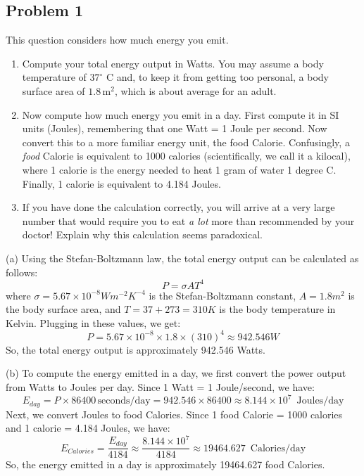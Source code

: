 \documentclass[letterpaper, 11pt]{article}
\newcommand{\1}{\mathds{1}}	%
\theoremstyle{definition}
\begin{document}
\subsection*{Problem 1}
This question considers how much energy you emit.

\begin{enumerate}
\item[(a)] Compute your total energy output in Watts. You may assume a body temperature of $37^\circ$ C and, to keep it from getting too personal, a body surface area of $1.8\,\text{m}^2$, which is about average for an adult.

\item[(b)] Now compute how much energy you emit in a day. First compute it in SI units (Joules), remembering that one Watt = 1 Joule per second. Now convert this to a more familiar energy unit, the food Calorie. Confusingly, a \textit{food} Calorie is equivalent to 1000 calories (scientifically, we call it a kilocal), where 1 calorie is the energy needed to heat 1 gram of water 1 degree C. Finally, 1 calorie is equivalent to 4.184 Joules.

\item[(c)] If you have done the calculation correctly, you will arrive at a very large number that would require you to eat \textit{a lot} more than recommended by your doctor! Explain why this calculation seems paradoxical.
\end{enumerate}

(a) Using the Stefan-Boltzmann law, the total energy output can be calculated as follows:
\[P = \sigma A T^4\]
where $\sigma = 5.67 \times 10^{-8} Wm^{-2}K^{-4}$ is the Stefan-Boltzmann constant, $A = 1.8 m^2$ is the body surface area, and $T = 37 + 273= 310 K$ is the body temperature in Kelvin. Plugging in these values, we get:
\[
P = 5.67 \times 10^{-8} \times 1.8 \times (310)^4 \approx 942.546 W
\]
So, the total energy output is approximately 942.546 Watts.

(b) To compute the energy emitted in a day, we first convert the power output from Watts to Joules per day. Since 1 Watt = 1 Joule/second, we have:
\[
E_{day} = P \times 86400 \, \text{seconds/day} = 942.546 \times 86400 \approx 8.144 \times 10^7 \, \text{ Joules/day}
\]
Next, we convert Joules to food Calories. Since 1 food Calorie = 1000 calories and 1 calorie = 4.184 Joules, we have:
\[
E_{Calories} = \frac{E_{day}}{4184} \approx \frac{8.144 \times 10^7}{4184} \approx 19464.627 \, \text{ Calories/day}
\]
So, the energy emitted in a day is approximately 19464.627 food Calories.
\end{document}
